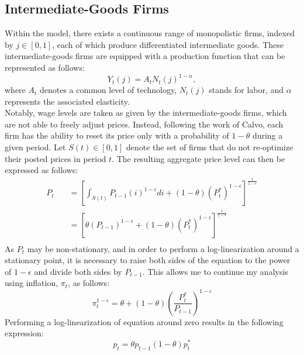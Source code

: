 \documentclass[11pt, a4paper, leqno]{article}
\begin{document}
\subsection{Intermediate-Goods Firms}
Within the model, there exists a continuous range of monopolistic firms, indexed by $j \in [0,1]$, each of which produce differentiated intermediate goods. These intermediate-goods firms are equipped with a production function that can be represented as follows:
\begin{equation}
		Y_{t}(j) = A_{t}N_{t}(j)^{1- \alpha},
\end{equation}
where $A_{t}$ denotes a common level of technology, $N_{t}(j)$ stands for labor, and $\alpha$ represents the associated elasticity.\\
Notably, wage levels are taken as given by the intermediate-goods firms, which are not able to freely adjust prices. Instead, following the work of Calvo, each firm has the ability to reset its price only with a probability of $1- \theta$ during a given period. Let $S(t) \in [0,1]$ denote the set of firms that do not re-optimize their posted prices in period $t$. The resulting aggregate price level can then be expressed as follows:
\begin{equation}
	\begin{aligned}
	P_{t} \quad & = \left[ \int_{S(t)}^{} P_{t-1}(i)^{1- \epsilon} di + (1- \theta) \left( P^{*}_{t} \right)^{1- \epsilon} \right]^{\frac{1}{1- \epsilon}}\\
		\quad & = \left[ \theta \left( P_{t-1} \right)^{1- \epsilon} + \left(1- \theta \right) \left( P^{*}_{t} \right)^{1- \epsilon} \right]^{\frac{1}{1- \epsilon}}\\
	\end{aligned}
\end{equation}
As $P_{t}$ may be non-stationary, and in order to perform a log-linearization around a stationary point, it is necessary to raise both sides of the equation to the power of $1- \epsilon$ and divide both sides by $P_{t-1}$. This allows me to continue my analysis using inflation, $\pi_{t}$, as follows:
\begin{equation}
	\pi_{t}^{1- \epsilon} = \theta + (1- \theta) \left( \frac{P^{*}_{t}}{P_{t-1}} \right)^{1- \epsilon}
\end{equation}
Performing a log-linearization of equation around zero results in the following expression:
\begin{equation}
	p_{t} = \theta p_{t-1} \left( 1- \theta \right) p^{*}_{t}
\end{equation}
\end{document}

